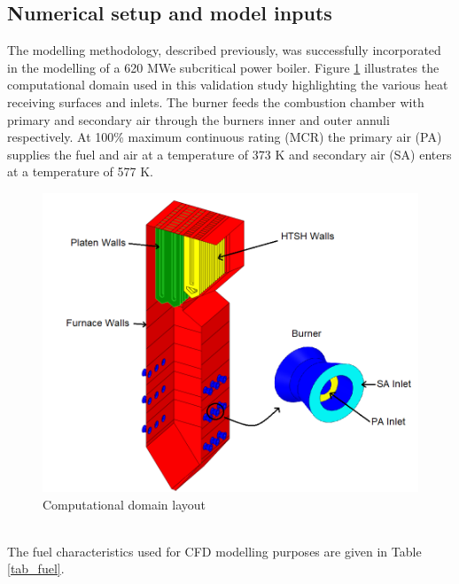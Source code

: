 \documentclass{webofc}
\begin{document}
\subsection{Numerical setup and model inputs} \label{Setup}
The modelling methodology, described previously, was successfully incorporated in the modelling of a 620 MWe subcritical power boiler. Figure \ref{comp_dom} illustrates the computational domain used in this validation study highlighting the various heat receiving surfaces and inlets. The burner feeds the combustion chamber with primary and secondary air through the burners inner and outer annuli respectively. At 100\% maximum continuous rating (MCR) the primary air (PA) supplies the fuel and air at a temperature of 373 K and secondary air (SA) enters at a temperature of 577 K.\\
\begin{figure}[h!]
\centering
\includegraphics[scale=0.375]{domain}
\setlength{\belowcaptionskip}{0pt}
\caption{Computational domain layout}
\label{comp_dom}
\end{figure} \\
The fuel characteristics used for CFD modelling purposes are given in Table \ref{tab_fuel}.
\end{document}
